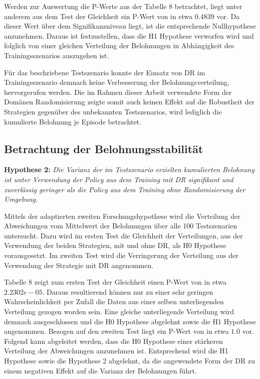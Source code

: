 Werden zur Auswertung die P-Werte aus der Tabelle 8 betrachtet, liegt unter anderem aus dem Test der Gleichheit ein P-Wert von in etwa $0.4839$ vor.
Da dieser Wert über dem Signifikanzniveau liegt, ist die entsprechende Nullhypothese anzunehmen.
Daraus ist festzustellen, dass die H1 Hypothese verworfen wird und folglich von einer gleichen Verteilung der Belohnungen in Abhängigkeit des Trainingsszenarios auszugehen ist.

Für das beschriebene Testszenario konnte der Einsatz von DR im Trainingsszenario demnach keine Verbesserung der Belohnungsverteilung, hervorgerufen werden.
Die im Rahmen dieser Arbeit verwendete Form der Domänen Randomisierung zeigte somit auch keinen Effekt auf die Robustheit der Strategien gegenüber des unbekannten Testszenarios, wird lediglich die kumulierte Belohnung je Episode betrachtet.

\subsection{Betrachtung der Belohnungsstabilität}

\textbf{Hypothese 2:}
\textit{Die Varianz der im Testszenario erzielten kumulierten Belohnung ist unter Verwendung der Policy aus dem Training mit DR signifikant und zuverlässig geringer als die Policy aus dem Training ohne Randomisierung der Umgebung.}

Mittels der adaptierten zweiten Forschungshypothese wird die Verteilung der Abweichungen vom Mittelwert der Belohnungen über alle 100 Testszenarien untersucht.
Dazu wird im ersten Test die Gleichheit der Verteilungen, aus der Verwendung der beiden Strategien, mit und ohne DR, als H0 Hypothese vorausgesetzt.
Im zweiten Test wird die Verringerung der Verteilung aus der Verwendung der Strategie mit DR angenommen.

Tabelle 8 zeigt zum ersten Test der Gleichheit einen P-Wert von in etwa $2.2302e-05$.
Daraus resultierend können nur zu einer sehr geringen Wahrscheinlichkeit per Zufall die Daten aus einer selben unterliegenden Verteilung gezogen worden sein.
Eine gleiche unterliegende Verteilung wird demnach ausgeschlossen und die H0 Hypothese abgelehnt sowie die H1 Hypothese angenommen.
Bezogen auf den zweiten Test liegt ein P-Wert von in etwa $1.0$ vor.
Folgend kann abgeleitet werden, dass die H0 Hypothese einer stärkeren Verteilung der Abweichungen anzunehmen ist.
Entsprechend wird die H1 Hypothese sowie die Hypothese 2 abgelehnt, da die angewendete Form der DR zu einem negativen Effekt auf die Varianz der Belohnungen führt.


